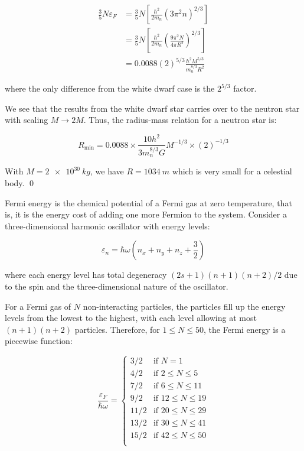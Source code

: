 \documentclass[12pt]{article}
\begin{document}
\begin{equation}
    \begin{split}
        \frac{3}{5} N \varepsilon_{F} &= \frac{3}{5} N \left[ \frac{\hbar^{2}}{2m_{n}} \left( 3\pi^{2} n \right)^{2/3} \right] \\
        &= \frac{3}{5} N \left[ \frac{\hbar^{2}}{2m_{n}} \left( \frac{9\pi^{2} N}{4\pi R^{3}} \right)^{2/3} \right] \\
        &= 0.0088 (2)^{5/3} \frac{h^{2}M^{5/3}}{m_{n}^{8/3}R^{2}}
    \end{split}
\end{equation}

where the only difference from the white dwarf case is the $2^{5/3}$ factor.

We see that the results from the white dwarf star carries over to the neutron star with scaling $M \to 2M$. Thus, the radius-mass relation for a neutron star is:

\begin{equation}
    R_{\text{min}} = 0.0088 \times \frac{10h^{2}}{3m_{n}^{8/3}G} M^{-1/3} \times (2)^{-1/3}
\end{equation}

With $M = \qty{2e30}{kg}$, we have $R = \qty{1034}{m}$ which is very small for a celestial body.
\qed


Fermi energy is the chemical potential of a Fermi gas at zero temperature, that is, it is the energy cost of adding one more Fermion to the system. Consider a three-dimensional harmonic oscillator with energy levels:

\begin{equation}
    \varepsilon_{n} = \hbar \omega \left( n_{x} + n_{y} + n_{z} + \frac{3}{2} \right)
\end{equation}

where each energy level has total degeneracy $(2s + 1)(n + 1)(n + 2)/2$ due to the spin and the three-dimensional nature of the oscillator.

For a Fermi gas of $N$ non-interacting particles, the particles fill up the energy levels from the lowest to the highest, with each level allowing at most $(n + 1)(n + 2)$ particles. Therefore, for $1 \leq N \leq 50$, the Fermi energy is a piecewise function:

\begin{equation}
    \frac{\varepsilon_{F}}{\hbar \omega} = \begin{cases}
        3/2  & \text{if } N = 1             \\
        4/2  & \text{if } 2 \leq N \leq 5   \\
        7/2  & \text{if } 6 \leq N \leq 11  \\
        9/2  & \text{if } 12 \leq N \leq 19 \\
        11/2 & \text{if } 20 \leq N \leq 29 \\
        13/2 & \text{if } 30 \leq N \leq 41 \\
        15/2 & \text{if } 42 \leq N \leq 50 \\
    \end{cases}
\end{equation}
\end{document}
